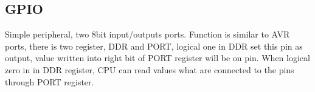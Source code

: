 \subsection{GPIO}
Simple peripheral, two 8bit input/outputs ports. Function is similar
to AVR ports, there is two register, DDR and PORT, logical one in DDR
set this pin as output, value written into right bit of PORT register
will be on pin. When logical zero in in DDR register, CPU can read
values what are connected to the pins through PORT register.
